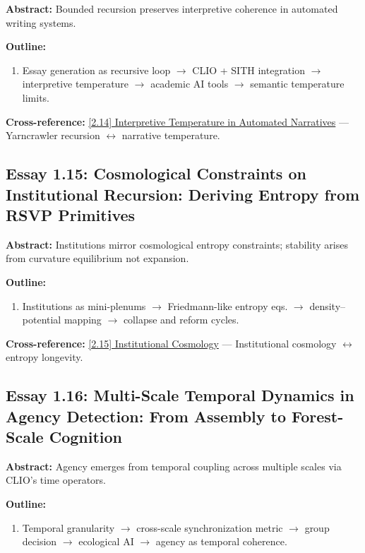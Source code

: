 \documentclass[12pt,a4paper]{article}
\begin{document}
\textbf{Abstract:} Bounded recursion preserves interpretive coherence in automated writing systems.

\textbf{Outline:}
\begin{enumerate}
\item Essay generation as recursive loop $\to$ CLIO + SITH integration $\to$ interpretive temperature  $\to$ academic AI tools $\to$ semantic temperature limits.
\end{enumerate}

\textbf{Cross-reference:} \hyperref[sec:essay2-14]{[2.14] Interpretive Temperature in Automated Narratives} --- Yarncrawler recursion $\leftrightarrow$ narrative temperature.

\subsection{Essay 1.15: Cosmological Constraints on Institutional Recursion: Deriving Entropy from RSVP Primitives}
\label{sec:essay1-15}

\textbf{Abstract:} Institutions mirror cosmological entropy constraints; stability arises from curvature equilibrium not expansion.

\textbf{Outline:}
\begin{enumerate}
\item Institutions as mini-plenums $\to$ Friedmann-like entropy eqs. $\to$ density--potential mapping $\to$ collapse and reform cycles.
\end{enumerate}

\textbf{Cross-reference:} \hyperref[sec:essay2-15]{[2.15] Institutional Cosmology} --- Institutional cosmology $\leftrightarrow$ entropy longevity.

\subsection{Essay 1.16: Multi-Scale Temporal Dynamics in Agency Detection: From Assembly to Forest-Scale Cognition}
\label{sec:essay1-16}

\textbf{Abstract:} Agency emerges from temporal coupling across multiple scales via CLIO’s time operators.

\textbf{Outline:}
\begin{enumerate}
\item Temporal granularity $\to$ cross-scale synchronization metric $\to$ group decision $\to$ ecological AI $\to$ agency as temporal coherence.
\end{enumerate}
\end{document}
